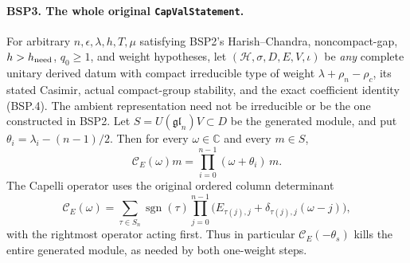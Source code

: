 \paragraph{BSP3. The whole original \texttt{CapValStatement}.}
\label{claim:BSP3}
For arbitrary $n,\epsilon,\lambda,h,T,\mu$ satisfying BSP2's
Harish--Chandra, noncompact-gap, $h>h_{\rm need}$, $q_0\ge1$,
and weight hypotheses, let $(\mathcal H,\sigma,D,E,V,\iota)$ be
\emph{any} complete unitary derived datum with compact irreducible
type of weight $\lambda+\rho_n-\rho_c$, its stated Casimir,
actual compact-group stability, and the exact coefficient identity
(BSP.4).  The ambient representation need not be irreducible or be
the one constructed in BSP2.
Let $S=U(\mathfrak{gl}_n)V\subset D$ be the generated module, and put
$\theta_i=\lambda_i-(n-1)/2$.  Then for every $\omega\in\mathbb C$
and every $m\in S$,
\[
 \mathcal C_E(\omega)m
       =\prod_{i=0}^{n-1}(\omega+\theta_i)\,m.
 \tag{BSP.5}
\]
The Capelli operator uses the original ordered column determinant
\[
 \mathcal C_E(\omega)
 =\sum_{\tau\in S_n}\operatorname{sgn}(\tau)
   \prod_{j=0}^{n-1}
       \bigl(E_{\tau(j),j}+\delta_{\tau(j),j}(\omega-j)\bigr),
 \tag{BSP.6}
\]
with the rightmost operator acting first.  Thus in particular
$\mathcal C_E(-\theta_s)$ kills the entire generated module, as needed
by both one-weight steps.


